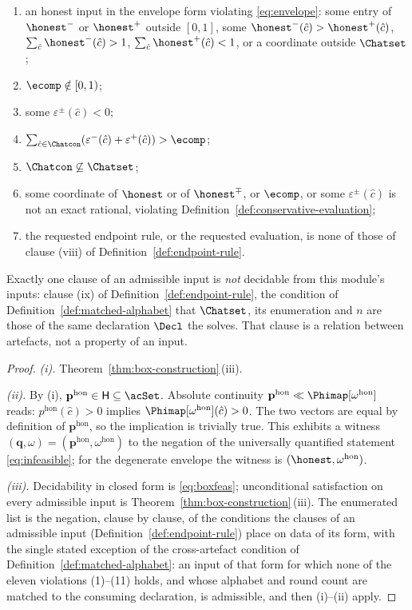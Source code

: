 \begin{theorem}
\begin{enumerate}[label=(\roman*),leftmargin=2.2em]
\begin{enumerate}[label=(\arabic*),leftmargin=2.2em]
$\honest\notin\simplex{\Chatset}$, including a coordinate outside
$\Chatset$;
\item an honest input in the envelope form violating \eqref{eq:envelope}:
some entry of ${\honest}^{-}$ or ${\honest}^{+}$ outside $[0,1]$, some
${\honest}^{-}(\hat c)>{\honest}^{+}(\hat c)$,
$\sum_{\hat c}{\honest}^{-}(\hat c)>1$, $\sum_{\hat c}{\honest}^{+}(\hat
c)<1$, or a coordinate outside $\Chatset$;
\item $\ecomp\notin[0,1)$;
\item some $\varepsilon^{\pm}(\hat c)<0$;
\item $\sum_{\hat c\in\Chatcon}(\varepsilon^{-}(\hat c)+\varepsilon^{+}(\hat
c))>\ecomp$;
\item $\Chatcon\not\subseteq\Chatset$;
\item some coordinate of $\honest$ or of ${\honest}^{\mp}$, or $\ecomp$, or
some $\varepsilon^{\pm}(\hat c)$ is not an exact rational, violating
Definition~\ref{def:conservative-evaluation};
\item the requested endpoint rule, or the requested evaluation, is none of
those of clause (viii) of Definition~\ref{def:endpoint-rule}.
\end{enumerate}
Exactly one clause of an admissible input is \emph{not} decidable from this
module's inputs: clause (ix) of Definition~\ref{def:endpoint-rule}, the
condition of Definition~\ref{def:matched-alphabet} that $\Chatset$, its
enumeration and $n$ are those of the same declaration $\Decl$ the
 solves. That clause
is a relation between artefacts, not a property of an input.
\end{enumerate}
\end{theorem}

\begin{proof}
\emph{(i).} Theorem~\ref{thm:box-construction}\,(iii).

\emph{(ii).} By (i), $\mathbf{p}^{\mathrm{hon}}\in\mathsf{H}\subseteq
\acSet$. Absolute continuity
$\mathbf{p}^{\mathrm{hon}}\ll\Phimap[\omega^{\mathrm{hon}}]$ reads:
$p^{\mathrm{hon}}(\hat c)>0$ implies
$\Phimap[\omega^{\mathrm{hon}}](\hat c)>0$. The two vectors are equal by
definition of $\mathbf{p}^{\mathrm{hon}}$, so the implication is trivially
true. This exhibits a witness
$(\mathbf{q},\omega)=(\mathbf{p}^{\mathrm{hon}},\omega^{\mathrm{hon}})$ to the
negation of the universally quantified statement \eqref{eq:infeasible}; for
the degenerate envelope the witness is $(\honest,\omega^{\mathrm{hon}})$.

\emph{(iii).} Decidability in closed form is \eqref{eq:boxfeas};
unconditional satisfaction on every admissible input is
Theorem~\ref{thm:box-construction}\,(iii). The enumerated list is the negation, clause by
clause, of the conditions the clauses of an admissible input
(Definition~\ref{def:endpoint-rule}) place on data of its form, with the
single stated exception of the cross-artefact condition of
Definition~\ref{def:matched-alphabet}: an input
of that form for which none of the eleven violations (1)--(11) holds, and
whose alphabet and round count are matched to the consuming declaration, is
admissible, and then
(i)--(ii) apply.
\end{proof}

